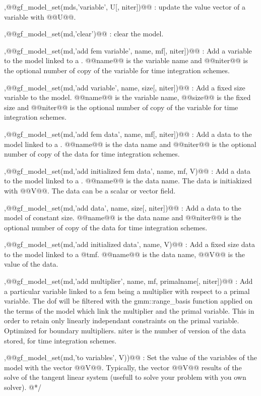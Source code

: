 \begin{cmddescription}
\sep{@@gf_model_set(mds,'variable', \tvec U[, \tint niter])@@} :
update the value vector of a variable with @@U@@.

\sep{@@gf_model_set(md,'clear')@@} :
clear the model.

\sep{@@gf_model_set(md,'add fem variable', \tstr name, \tmf mf[, \tint niter])@@} :
Add a variable to the model linked to a \tmf. @@name@@ is the variable name
    and @@niter@@ is the optional number of copy of the variable for time
    integration schemes.

\sep{@@gf_model_set(md,'add variable', \tstr name, \tint size[, \tint niter])@@} :
Add a fixed size variable to the model. @@name@@ is the variable name, @@size@@ is the fixed size and @@niter@@ is the optional number of copy of the variable for time integration schemes.

\sep{@@gf_model_set(md,'add fem data', \tstr name, \tmf mf[, \tint niter])@@} :
Add a data to the model linked to a \tmf. @@name@@ is the data name
and @@niter@@ is the optional number of copy of the data for time
integration schemes.

\sep{@@gf_model_set(md,'add initialized fem data', \tstr name, \tmf mf, \tvec V)@@} :
Add a data to the model linked to a \tmf. @@name@@ is the data name.
The data is initiakized with @@V@@. The data can be a scalar or vector field.

\sep{@@gf_model_set(md,'add data', \tstr name, \tint size[, \tint niter])@@} :
Add a data to the model of constant size. @@name@@ is the data name
and @@niter@@ is the optional number of copy of the data for time
integration schemes.

\sep{@@gf_model_set(md,'add initialized data', \tstr name, \tvec V)@@} :
Add a fixed size data to the model linked to a @tmf.
@@name@@ is the data name, @@V@@ is the value of the data.

\sep{@@gf_model_set(md,'add multiplier', \tstr name, \tmf mf, \tstr primalname[, \tint niter])@@} :
Add a particular variable linked to a fem being a multiplier with
respect to a primal variable. The dof will be filtered with the
gmm::range_basis function applied on the terms of the model which
link the multiplier and the primal variable. This in order to
retain only linearly independant constraints on the primal variable.
Optimized for boundary multipliers. niter is the number of version
of the data stored, for time integration schemes.

\sep{@@gf_model_set(md,'to variables', \tvec V))@@} :
Set the value of the variables of the model with the vector @@V@@.
Typically, the vector @@V@@ results of the solve of the tangent linear
system (usefull to solve your problem with you own solver). @*/


\end{cmddescription}

